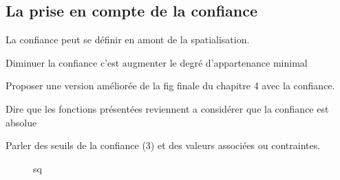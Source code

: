 \subsection{La prise en compte de la confiance}

La confiance peut se définir en amont de la spatialisation.

Diminuer la confiance c'est augmenter le degré d'appartenance minimal

Proposer une version améliorée de la fig finale du chapitre 4 avec la
confiance.

Dire que les fonctions présentées reviennent a considérer que la
confiance est absolue

Parler des seuils de la confiance (3) et des valeurs associées ou
contraintes.


\begin{figure}
  \centering
  
  \caption{sq}
  \label{fig:qs}
\end{figure}





